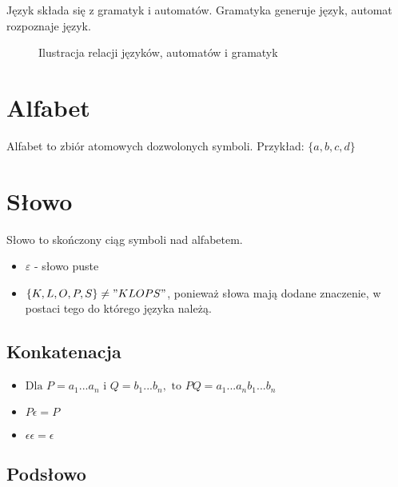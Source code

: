 \documentclass{../notatki}
\begin{document}
Język składa się z gramatyk i automatów. Gramatyka generuje język,
automat rozpoznaje język.

\begin{figure}[H]
  \centering
  \caption{Ilustracja relacji języków, automatów i gramatyk}
\end{figure}

\section{Alfabet}

Alfabet to zbiór atomowych dozwolonych symboli. Przykład: $\{a, b, c, d\}$

\section{Słowo}

Słowo to skończony ciąg symboli nad alfabetem.

\begin{itemize}
  \item $\varepsilon$ - słowo puste
  \item $\{K, L, O, P, S\} \ne "KLOPS"$, ponieważ słowa mają dodane
    znaczenie, w postaci tego do którego języka należą.
\end{itemize}

\subsection{Konkatenacja}

\begin{itemize}
  \item $\text{Dla } P=a_1...a_n \text{ i } Q=b_1...b_n, \text{ to }
    PQ=a_1...a_nb_1...b_n$
  \item $P\epsilon = P$
  \item $\epsilon\epsilon = \epsilon$
\end{itemize}

\subsection{Podsłowo}
\end{document}
